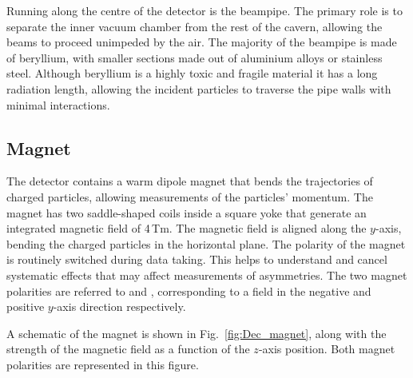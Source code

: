 Running along the centre of the detector is the \lhcb beampipe. The primary role is to separate the inner vacuum chamber from the rest of the cavern, allowing the beams to proceed unimpeded by the air. The majority of the beampipe is made of beryllium, with smaller sections made out of aluminium alloys or stainless steel. Although beryllium is a highly toxic and fragile material it has a long radiation length, allowing the incident particles to traverse the pipe walls with minimal interactions.  


\subsection{Magnet}

The \lhcb detector contains a warm dipole magnet that bends the trajectories of charged particles, allowing measurements of the particles' momentum. The magnet has two saddle-shaped coils inside a square yoke that generate an integrated magnetic field of 4\,Tm.  
The magnetic field is aligned along the $y$-axis, bending the charged particles in the horizontal plane. The polarity of the magnet is routinely switched during data taking. This helps to understand and cancel systematic effects that may affect measurements of \CP asymmetries. The two magnet polarities are referred to \MagDown and \MagUp, corresponding to a field in the negative and positive $y$-axis direction respectively.   

A schematic of the magnet is shown in Fig.~\ref{fig:Dec_magnet}, along with the strength of the magnetic field as a function of the $z$-axis position. Both magnet polarities are represented in this figure. 


